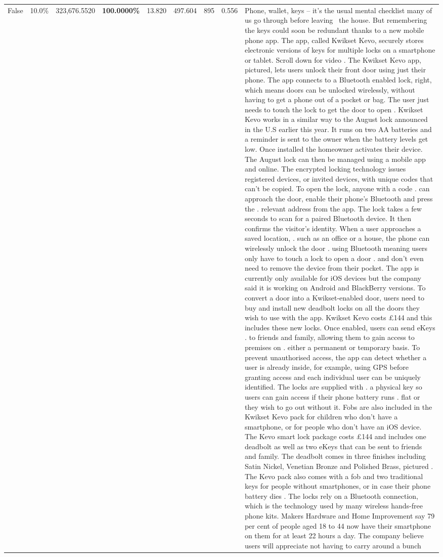 \begin{table}[H]
\begin{tabular}{lllrlllll}
False & 10.0\% & 323,676.5520 & \bfseries \color{red} 100.0000\% & 13.820 & 497.604 & 895 & 0.556 & Phone, wallet, keys – it’s the usual mental checklist many of us go through before leaving  the house. But remembering the keys could soon be redundant thanks to a new mobile phone app. The app, called Kwikset Kevo, securely stores electronic versions of keys for multiple locks on a smartphone or tablet. Scroll down for video . The Kwikset Kevo app, pictured, lets users unlock their front door using just their phone. The app connects to a Bluetooth enabled lock, right, which means doors can be unlocked wirelessly, without having to get a phone out of a pocket or bag. The user just needs to touch the lock to get the door to open . Kwikset Kevo works in a similar way to the August lock announced in the U.S earlier this year. It runs on two AA batteries and a reminder is sent to the owner when the battery levels get low. Once installed the homeowner activates their device. The August lock can then be managed using a mobile app and online. The encrypted locking technology issues registered devices, or invited devices, with unique codes that can't be copied. To open the lock, anyone with a code . can approach the door, enable their phone's Bluetooth and press the . relevant address from the app. The lock takes a few seconds to scan for a paired Bluetooth device. It then confirms the visitor's identity. When a user approaches a saved location, . such as an office or a house, the phone can wirelessly unlock the door . using Bluetooth meaning users only have to touch a lock to open a door . and don't even need to remove the device from their pocket. The app is currently only available for iOS devices but the company said it is working on Android and BlackBerry versions. To convert a door into a Kwikset-enabled door, users need to buy and install new deadbolt locks on all the doors they wish to use with the app. Kwikset Kevo costs £144 and this includes these new locks. Once enabled, users can send eKeys . to friends and family, allowing them to gain access to premises on . either a permanent or temporary basis. To prevent unauthorised access, the app can detect whether a user is already inside, for example, using GPS before granting access and each individual user can be uniquely identified. The locks are supplied with . a physical key so users can gain access if their phone battery runs . flat or they wish to go out without it. Fobs are also included in the Kwikset Kevo pack for children who don't have a smartphone, or for people who don't have an iOS device. The Kevo smart lock package costs £144 and includes one deadbolt as well as two eKeys that can be sent to friends and family. The deadbolt comes in three finishes including Satin Nickel, Venetian Bronze and Polished Brass, pictured . The Kevo pack also comes with a fob and two traditional keys for people without smartphones, or in case their phone battery dies . The locks rely on a Bluetooth connection, which is the technology used by many wireless hands-free phone kits. Makers Hardware and Home Improvement say 79 per cent of people aged 18 to 44 now have their smartphone on them for at least 22 hours a day. The company believe users will appreciate not having to carry around a bunch 
\end{tabular}
\end{table}
